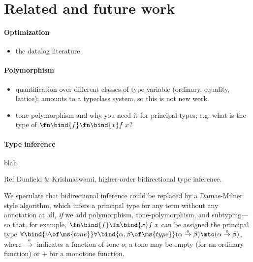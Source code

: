 \section{Related and future work}
\label{sec:futurework}

\paragraph{Optimization}
\begin{itemize}
\item \TODO the datalog literature
\end{itemize}

\paragraph{Polymorphism}
\begin{itemize}
\item \TODO quantification over different classes of type variable (ordinary,
  equality, lattice); amounts to a typeclass system, so this is not new work.
\item \TODO tone polymorphism and why you need it for principal types; e.g.
  what is the type of $\fn\bind{f}\fn\bind{x} f\;x$?
\end{itemize}

\paragraph{Type inference} blah

\TODO Ref Dunfield \& Krishnaswami, higher-order bidirectional type inference.

 We speculate that bidirectional inference could be replaced by a
Damas-Milner  style algorithm, which infers a principal type for any
term without any annotation at all, \emph{if} we add polymorphism,
tone-polymorphism, and subtyping---so that, for example, $\fn\bind{f}\fn\bind{x}
f\;x$ can be assigned the principal type
$\forall\bind{o\of\ms{tone}}\forall\bind{\alpha,\beta \of \ms{type}} (\alpha
\overset{o}\to \beta) \mto (\alpha \overset{o}\to \beta)$, where
$\overset{o}\to$ indicates a function of tone $o$; a tone may be empty (for an
ordinary function) or ${+}$ for a monotone function.

